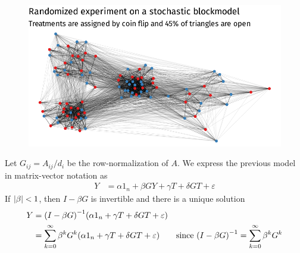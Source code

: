 \documentclass[aspectratio=169]{beamer}
\theoremstyle{remark}
\begin{document}
\begin{frame}
    \begin{figure}
        \centering
        \includegraphics{figures/simulations/defense-backbone.pdf}
    \end{figure}
\end{frame}


\begin{frame}
    Let $G_{ij} = A_{ij} / d_i$ be the row-normalization of $A$. We express the previous model in matrix-vector notation as
    \begin{align*}
        Y & = \alpha 1_n + \beta G Y + \gamma T + \delta G T + \varepsilon
    \end{align*}
    If $\lvert\beta\rvert < 1$, then $I - \beta G$ is invertible and there is a unique solution 
    \begin{align*}
        Y & = \paren*{I - \beta G}^{-1} \paren*{\alpha 1_n + \gamma T + \delta G T + \varepsilon}                                                                                \\
          & = \sum_{k=0}^\infty \beta^k G^k \paren*{\alpha 1_n + \gamma T + \delta G T + \varepsilon} & \text{since } \paren*{I - \beta G}^{-1} = \sum_{k=0}^\infty \beta^k G^k
    \end{align*}
\end{frame}
\end{document}
